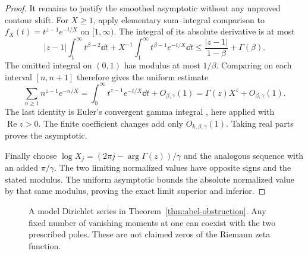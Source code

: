 \begin{proof}
It remains to justify the smoothed asymptotic without any
unproved contour shift. For \(X\ge1\), apply elementary
sum--integral comparison to
\(f_X(t)=t^{z-1}e^{-t/X}\) on \([1,\infty)\). The integral
of its absolute derivative is at most
\[
 |z-1|\int_1^\infty t^{\beta-2}\dd t
   +X^{-1}\int_1^\infty t^{\beta-1}e^{-t/X}\dd t
 \le\frac{|z-1|}{1-\beta}+\Gamma(\beta).
\]
The omitted integral on \((0,1)\) has modulus at most
\(1/\beta\). Comparing on each interval \([n,n+1]\)
therefore gives the uniform estimate
\[
 \sum_{n\ge1}n^{z-1}e^{-n/X}
       =\int_0^\infty t^{z-1}e^{-t/X}\dd t+O_{\beta,\gamma}(1)
       =\Gamma(z)X^z+O_{\beta,\gamma}(1).
\]
The last identity is Euler's convergent gamma integral
\cite[\S5.9(i)]{dlmf-gamma}, here applied with
\(\operatorname{Re}z>0\). The finite coefficient changes
add only \(O_{k,\beta,\gamma}(1)\). Taking real parts
proves the asymptotic.

Finally choose
\(\log X_j=(2\pi j-\arg\Gamma(z))/\gamma\)
and the analogous sequence with an added \(\pi/\gamma\).
The two limiting normalized values have opposite signs and
the stated modulus. The uniform asymptotic bounds the
absolute normalized value by that same modulus, proving
the exact limit superior and inferior.
\end{proof}

\begin{figure}[ht]
\centering
{}
\caption{A model Dirichlet series in Theorem~\ref{thm:abel-obstruction}.
Any fixed number of vanishing moments at one can coexist with
the two prescribed poles. These are not claimed zeros of
the Riemann zeta function.}\label{fig:model-mellin-poles}
\end{figure}

